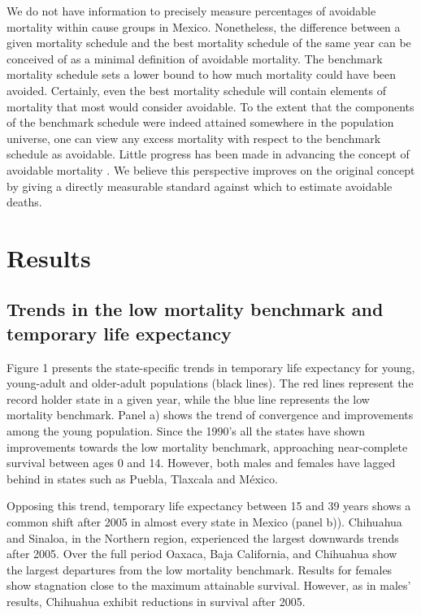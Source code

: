 \documentclass[11.5pt]{article}
\begin{document}
\begin{spacing}{1.5}
We do not have information to precisely
measure percentages of avoidable mortality within cause groups in Mexico. Nonetheless, the
difference between a given mortality schedule and the best mortality schedule of
the same year can be conceived of as a minimal definition of avoidable
mortality. The benchmark mortality schedule sets a lower bound to how much mortality could have been avoided. Certainly, even the best mortality schedule will contain elements of mortality that
most would consider avoidable. To the extent that the components of the benchmark schedule were indeed
attained somewhere in the population universe, one can view any excess mortality
with respect to the benchmark schedule as avoidable. Little progress has been made in advancing the concept of avoidable mortality \citep{holland2003}. We believe this perspective improves on the original concept by giving a directly measurable standard against which to estimate avoidable deaths.


\section*{Results}
\subsection*{Trends in the low mortality benchmark and temporary life expectancy}
Figure 1 presents the state-specific trends in temporary life expectancy for young, young-adult and older-adult populations (black lines). The red lines represent the record holder state in a given year, while the blue line represents the low mortality benchmark. Panel a) shows the trend of convergence and improvements among the young population. Since the 1990's all the states have shown improvements towards the low mortality benchmark, approaching near-complete survival between ages 0 and 14. However, both males and females have lagged behind in states such as Puebla, Tlaxcala and M\'exico.

Opposing this trend, temporary life expectancy between 15 and 39 years shows a common shift after 2005 in almost every state in Mexico  (panel b)). Chihuahua and Sinaloa, in the Northern region, experienced the largest downwards trends after 2005. Over the full period Oaxaca, Baja California, and Chihuahua  show the largest departures from the low mortality benchmark. Results for females show stagnation close to the maximum attainable survival. However,  as in males' results, Chihuahua exhibit reductions in survival after 2005.


\end{spacing}
\end{document}
